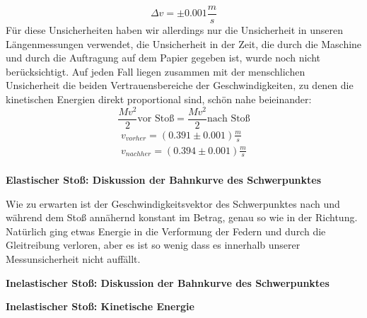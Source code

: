 \documentclass{article}
\begin{document}
\begin{equation}
\Delta v=\pm 0.001 \frac{m}{s}
\end{equation}
Für diese Unsicherheiten haben wir allerdings nur die Unsicherheit in unseren Längenmessungen verwendet, die Unsicherheit in der Zeit, die durch die Maschine und durch die Auftragung auf dem Papier gegeben ist, wurde noch nicht berücksichtigt. Auf jeden Fall liegen zusammen mit der menschlichen Unsicherheit die beiden Vertrauensbereiche der Geschwindigkeiten, zu denen die kinetischen Energien direkt proportional sind, schön nahe beieinander:
\begin{equation}
\frac{Mv^2}{2} \text{vor Stoß} = \frac{Mv^2}{2}  \text{nach Stoß} 
\end{equation}
\begin{gather*}
v_{vorher}=(0.391 \pm 0.001) \frac{m}{s} \\
v_{nachher}=( 0.394 \pm 0.001) \frac{m}{s}
\end{gather*}\\
\textbf{Elastischer Stoß: Diskussion der Bahnkurve des Schwerpunktes}

Wie zu erwarten ist der Geschwindigkeitsvektor des Schwerpunktes nach und während dem Stoß annähernd konstant im Betrag, genau so wie in der Richtung. Natürlich ging etwas Energie in die Verformung der Federn und durch die Gleitreibung verloren, aber es ist so wenig dass es innerhalb unserer Messunsicherheit nicht auffällt.

\textbf{Inelastischer Stoß: Diskussion der Bahnkurve des Schwerpunktes}

\textbf{Inelastischer Stoß: Kinetische Energie}
\end{document}
